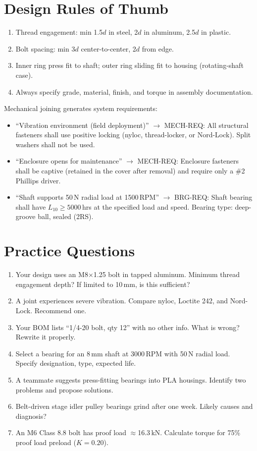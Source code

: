 \documentclass[11pt,letterpaper,twoside,openany]{book}
\begin{document}
\section{Design Rules of Thumb}
\begin{enumerate}[leftmargin=1.5em]
\item Thread engagement: min 1.5$d$ in steel, 2$d$ in aluminum, 2.5$d$ in plastic.
\item Bolt spacing: min 3$d$ center-to-center, 2$d$ from edge.
\item Inner ring press fit to shaft; outer ring sliding fit to housing (rotating-shaft case).
\item Always specify grade, material, finish, and torque in assembly documentation.
\end{enumerate}


\begin{keyconceptbox}
Mechanical joining generates system requirements:
\begin{itemize}[nosep,leftmargin=1.5em]
\item ``Vibration environment (field deployment)'' $\to$ MECH-REQ: All structural fasteners shall use positive locking (nyloc, thread-locker, or Nord-Lock). Split washers shall not be used.
\item ``Enclosure opens for maintenance'' $\to$ MECH-REQ: Enclosure fasteners shall be captive (retained in the cover after removal) and require only a \#2 Phillips driver.
\item ``Shaft supports 50\,N radial load at 1500\,RPM'' $\to$ BRG-REQ: Shaft bearing shall have $L_{10} \geq 5000$\,hrs at the specified load and speed. Bearing type: deep-groove ball, sealed (2RS).
\end{itemize}
\end{keyconceptbox}

\section{Practice Questions}
\begin{enumerate}[leftmargin=1.5em]
\item Your design uses an M8$\times$1.25 bolt in tapped aluminum. Minimum thread engagement depth? If limited to 10\,mm, is this sufficient?
\item A joint experiences severe vibration. Compare nyloc, Loctite 242, and Nord-Lock. Recommend one.
\item Your BOM lists ``1/4-20 bolt, qty 12'' with no other info. What is wrong? Rewrite it properly.
\item Select a bearing for an 8\,mm shaft at 3000\,RPM with 50\,N radial load. Specify designation, type, expected life.
\item A teammate suggests press-fitting bearings into PLA housings. Identify two problems and propose solutions.
\item Belt-driven stage idler pulley bearings grind after one week. Likely causes and diagnosis?
\item An M6 Class 8.8 bolt has proof load $\approx$16.3\,kN. Calculate torque for 75\% proof load preload ($K=0.20$).
\end{enumerate}
\end{document}
